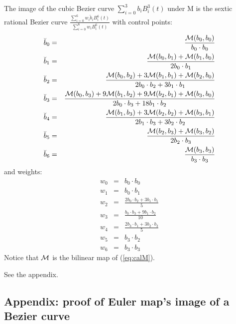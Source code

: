 \documentclass[12pt]{article}
\begin{document}
\begin{theorem}
\label{thm:imagecurve}
The image of the cubic Bezier curve $\sum_{i=0}^3 b_i B_i^3(t)$ under M 
is the sextic rational Bezier curve $\frac{\sum_{i=0}^6 w_i \breve{b}_i B_i^6(t)}
                                          {\sum_{i=0}^6 w_i B_i^6(t)}$ 
with control points:
\begin{eqnarray}
\breve{b}_0 & = & \frac{{\cal M}(b_0,b_0)}{b_0 \cdot b_0} \nonumber \\
\breve{b}_1 & = & \frac{{\cal M}(b_0,b_1) + {\cal M}(b_1,b_0)}{2b_0\cdot b_1} \nonumber \\
\breve{b}_2 & = & \frac{{\cal M}(b_0,b_2) + 3{\cal M}(b_1,b_1) + {\cal M}(b_2,b_0)}{2b_0 \cdot b_2 + 3b_1 \cdot b_1} \nonumber \\
\breve{b}_3 & = & \frac{{\cal M}(b_0,b_3) + 9{\cal M}(b_1,b_2) + 9{\cal M}(b_2,b_1) + {\cal M}(b_3,b_0)}{2b_0 \cdot b_3 + 18 b_1 \cdot b_2} \nonumber \\
\breve{b}_4 & = & \frac{{\cal M}(b_1,b_3) + 3{\cal M}(b_2,b_2) + {\cal M}(b_3,b_1)}{2b_1 \cdot b_3 + 3 b_2 \cdot b_2} \nonumber \\
\breve{b}_5 & = & \frac{{\cal M}(b_2,b_3) + {\cal M}(b_3,b_2)}{2b_2 \cdot b_3} \nonumber \\
\breve{b}_6 & = & \frac{{\cal M}(b_3,b_3)}{b_3 \cdot b_3} \nonumber
\end{eqnarray}
and weights:
\begin{eqnarray}
w_0 & = & b_0 \cdot b_0 \nonumber \\
w_1 & = & b_0 \cdot b_1 \nonumber \\
w_2 & = & \frac{2b_0 \cdot b_2 + 3b_1 \cdot b_1}{5} \nonumber \\
w_3 & = & \frac{b_0 \cdot b_3 + 9b_1 \cdot b_2}{10} \nonumber \\
w_4 & = & \frac{2b_3 \cdot b_1 + 3b_2 \cdot b_2}{5} \nonumber \\
w_5 & = & b_3 \cdot b_2 \nonumber \\
w_6 & = & b_3 \cdot b_3 \nonumber
\end{eqnarray}
Notice that ${\cal M}$ is the bilinear map of (\ref{eq:calM}).
\end{theorem}
\prf See the appendix.
\QED

\clearpage

\subsection{Appendix: proof of Euler map's image of a Bezier curve}
\label{sec:appendix}
\end{document}
